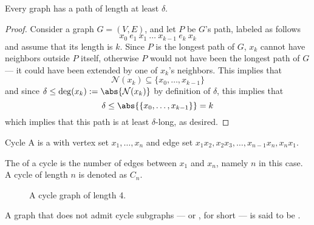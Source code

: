 \documentclass[a4paper, 12pt]{report}
\begin{document}
    \begin{framedprop}{}
        Every graph has a path of length at least $\delta$.
    \end{framedprop}
    
    \begin{proof}
        Consider a graph $G = (V, E)$, and let $P$ be $G$'s  path, labeled as follows $$x_0 \ e_1 \ x_1 \ \ldots \ x_{k - 1} \ e_k \ x_k$$ and assume that its length is $k$. Since $P$ is the longest path of $G$, $x_k$ cannot have neighbors outside $P$ itself, otherwise $P$ would not have been the longest path of $G$ --- it could have been extended by one of $x_k$'s neighbors. This implies that $$\mathcal N(x_k) \subseteq \{x_0, \ldots, x_{k - 1}\}$$ and since $\delta \le \deg(x_k) := \abs{\mathcal N(x_k)}$ by definition of $\delta$, this implies that $$\delta \le \abs{\{x_0, \ldots, x_{k - 1}\}} = k$$ which implies that this path is at least $\delta$-long, as desired.
    \end{proof}

    \begin{frameddefn}{Cycle}
        A  is a  with vertex set $x_1, \ldots, x_n$ and edge set $x_1x_2, x_2x_3, \ldots, x_{n- 1}x_n, x_nx_1$.

        The  of a cycle is the number of edges between $x_1$ and $x_n$, namely $n$ in this case. A cycle of length $n$ is denoted as $C_n$.
    \end{frameddefn}

        \begin{figure}[H]
        \centering
        \caption{A cycle graph of length 4.}
    \end{figure}

    A graph that does not admit cycle subgraphs --- or , for short --- is said to be .
\end{document}
